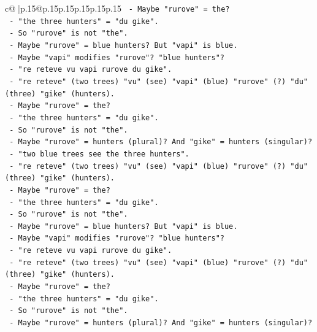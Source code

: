 \documentclass{article}
\begin{document}
{\begin{supertabular}{c@{$\;$}|p{.15\linewidth}@{}p{.15\linewidth}p{.15\linewidth}p{.15\linewidth}p{.15\linewidth}p{.15\linewidth}}
{{{\texttt{           {-} Maybe "rurove" = the?} \\
\texttt{           {-} "the three hunters" = "du gike".} \\
\texttt{           {-} So "rurove" is not "the".} \\
\texttt{           {-} Maybe "rurove" = blue hunters? But "vapi" is blue.} \\
\texttt{           {-} Maybe "vapi" modifies "rurove"? "blue hunters"?} \\
\texttt{           {-} "re reteve vu vapi rurove du gike".} \\
\texttt{           {-} "re reteve" (two trees) "vu" (see) "vapi" (blue) "rurove" (?) "du" (three) "gike" (hunters).} \\
\texttt{           {-} Maybe "rurove" = the?} \\
\texttt{           {-} "the three hunters" = "du gike".} \\
\texttt{           {-} So "rurove" is not "the".} \\
\texttt{           {-} Maybe "rurove" = hunters (plural)? And "gike" = hunters (singular)?} \\
\texttt{           {-} "two blue trees see the three hunters".} \\
\texttt{           {-} "re reteve" (two trees) "vu" (see) "vapi" (blue) "rurove" (?) "du" (three) "gike" (hunters).} \\
\texttt{           {-} Maybe "rurove" = the?} \\
\texttt{           {-} "the three hunters" = "du gike".} \\
\texttt{           {-} So "rurove" is not "the".} \\
\texttt{           {-} Maybe "rurove" = blue hunters? But "vapi" is blue.} \\
\texttt{           {-} Maybe "vapi" modifies "rurove"? "blue hunters"?} \\
\texttt{           {-} "re reteve vu vapi rurove du gike".} \\
\texttt{           {-} "re reteve" (two trees) "vu" (see) "vapi" (blue) "rurove" (?) "du" (three) "gike" (hunters).} \\
\texttt{           {-} Maybe "rurove" = the?} \\
\texttt{           {-} "the three hunters" = "du gike".} \\
\texttt{           {-} So "rurove" is not "the".} \\
\texttt{           {-} Maybe "rurove" = hunters (plural)? And "gike" = hunters (singular)?} \\
}}}
\end{supertabular}}
\end{document}
